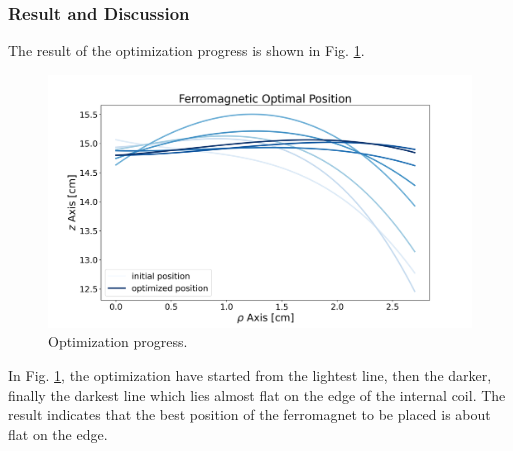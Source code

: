 \subsubsection{Result and Discussion}
The result of the optimization progress is shown in Fig. \ref{fig:FMOptimization}.
\begin{figure}[H]
  \includegraphics[width=18cm, bb=9 9 900 550]{./section4Optimal/FMOptimization.png}
  \caption{Optimization progress.}
  \label{fig:FMOptimization}
\end{figure}
In Fig. \ref{fig:FMOptimization}, the optimization have started from the lightest line, then the darker,
finally the darkest line which lies almost flat on the edge of the internal coil.
The result indicates that the best position of the ferromagnet to be placed is about flat on the edge.

